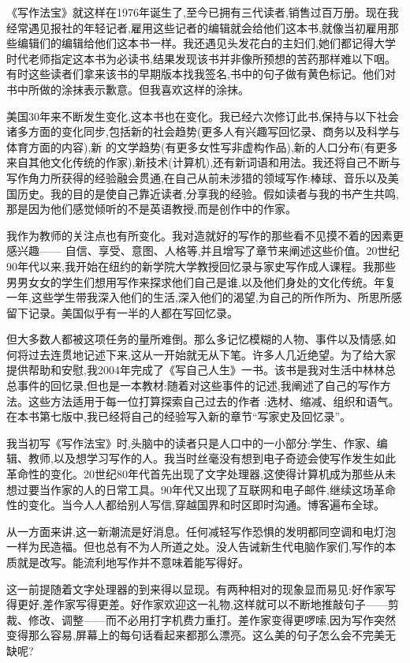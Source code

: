 \documentclass{ctexbook}
\begin{document}
《写作法宝》就这样在1976年诞生了,至今已拥有三代读者,销售过百万册。现在我经常遇见报社的年轻记者,雇用这些记者的编辑就会给他们这本书,就像当初雇用那些编辑们的编辑给他们这本书一样。我还遇见头发花白的主妇们,她们都记得大学时代老师指定这本书为必读书,结果发现该书并非像所预想的苦药那样难以下咽。有时这些读者们拿来该书的早期版本找我签名,书中的句子做有黄色标记。他们对书中所做的涂抹表示歉意。但我喜欢这样的涂抹。

美国30年来不断发生变化,这本书也在变化。我已经六次修订此书,保持与以下社会诸多方面的变化同步,包括新的社会趋势(更多人有兴趣写回忆录、商务以及科学与体育方面的内容),新 的文学趋势(有更多女性写非虚构作品),新的人口分布(有更多来自其他文化传统的作家),新技术(计算机),还有新词语和用法。我还将自己不断与写作角力所获得的经验融会贯通,在自己从前未涉猎的领域写作:棒球、音乐以及美国历史。我的目的是使自己靠近读者,分享我的经验。假如读者与我的书产生共鸣,那是因为他们感觉倾听的不是英语教授,而是创作中的作家。

我作为教师的关注点也有所变化。我对造就好的写作的那些看不见摸不着的因素更感兴趣—— 自信、享受、意图、人格等,并且增写了章节来阐述这些价值。20世纪90年代以来,我开始在纽约的新学院大学教授回忆录与家史写作成人课程。我那些男男女女的学生们想用写作来探求他们自己是谁,以及他们身处的文化传统。年复一年,这些学生带我深入他们的生活,深入他们的渴望,为自己的所作所为、所思所感留下记录。美国似乎有一半的人都在写回忆录。

但大多数人都被这项任务的量所难倒。那么多记忆模糊的人物、事件以及情感,如何将过去连贯地记述下来,这从一开始就无从下笔。许多人几近绝望。为了给大家提供帮助和安慰,我2004年完成了《写自己人生》一书。该书是我对生活中林林总总事件的回忆录,但也是一本教材:随着对这些事件的记述,我阐述了自己的写作方法。这些方法适用于每一位打算探索自己过去的作者 :选材、缩减、组织和语气。在本书第七版中,我已经将自己的经验写入新的章节“写家史及回忆录”。

我当初写《写作法宝》时,头脑中的读者只是人口中的一小部分:学生、作家、编辑、教师,以及想学习写作的人。我当时丝毫没有想到电子奇迹会使写作发生如此革命性的变化。20世纪80年代首先出现了文字处理器,这使得计算机成为那些从未想过要当作家的人的日常工具。90年代又出现了互联网和电子邮件,继续这场革命性的变化。当今人人都给别人写信,穿越国界和时区即时沟通。博客遍布全球。

从一方面来讲,这一新潮流是好消息。任何减轻写作恐惧的发明都同空调和电灯泡一样为民造福。但也总有不为人所道之处。没人告诫新生代电脑作家们,写作的本质就是改写。能流利地写作并不意味着能写得好。

这一前提随着文字处理器的到来得以显现。有两种相对的现象显而易见:好作家写得更好,差作家写得更差。好作家欢迎这一礼物,这样就可以不断地推敲句子——剪裁、修改、调整——而不必用打字机费力重打。差作家变得更啰嗦,因为写作突然变得那么容易,屏幕上的每句话看起来都那么漂亮。这么美的句子怎么会不完美无缺呢?
\end{document}

